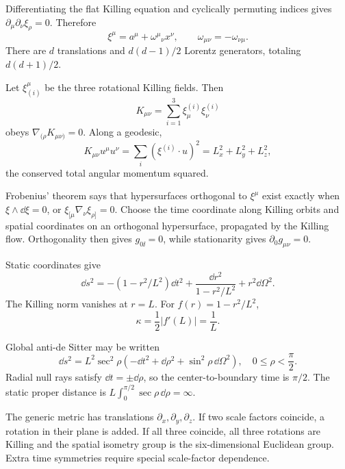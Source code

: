 \begin{solution}
Differentiating the flat Killing equation and cyclically permuting indices
gives \(\partial_\mu\partial_\nu\xi_\rho=0\).  Therefore
\[
\xi^\mu=a^\mu+\omega^\mu{}_\nu x^\nu,\qquad
\omega_{\mu\nu}=-\omega_{\nu\mu}.
\]
There are \(d\) translations and \(d(d-1)/2\) Lorentz generators, totaling
\(d(d+1)/2\).
\end{solution}

\begin{solution}
Let \(\xi_{(i)}^\mu\) be the three rotational Killing fields.  Then
\[
K_{\mu\nu}=\sum_{i=1}^3\xi^{(i)}_\mu\xi^{(i)}_\nu
\]
obeys \(\nabla_{(\rho}K_{\mu\nu)}=0\).  Along a geodesic,
\[
K_{\mu\nu}u^\mu u^\nu
=\sum_i(\xi^{(i)}\cdot u)^2=L_x^2+L_y^2+L_z^2,
\]
the conserved total angular momentum squared.
\end{solution}

\begin{solution}
Frobenius' theorem says that hypersurfaces orthogonal to \(\xi^\mu\) exist
exactly when
\(\xi\wedge\dd\xi=0\), or
\(\xi_{[\mu}\nabla_\nu\xi_{\rho]}=0\).  Choose the time coordinate along
Killing orbits and spatial coordinates on an orthogonal hypersurface,
propagated by the Killing flow.  Orthogonality then gives \(g_{0\ii}=0\), while
stationarity gives \(\partial_0g_{\mu\nu}=0\).
\end{solution}

\begin{solution}
Static coordinates give
\[
\dd s^2=-(1-r^2/L^2)\dd t^2
+\frac{\dd r^2}{1-r^2/L^2}+r^2\dd\Omega^2.
\]
The Killing norm vanishes at \(r=L\).  For
\(f(r)=1-r^2/L^2\),
\[
\kappa=\frac12|f'(L)|=\frac1L.
\]
\end{solution}

\begin{solution}
Global anti-de Sitter may be written
\[
\dd s^2=L^2\sec^2\rho
(-\dd t^2+\dd\rho^2+\sin^2\rho\,\dd\Omega^2),
\quad0\leq\rho<\frac\pi2.
\]
Radial null rays satisfy \(\dd t=\pm\dd\rho\), so the center-to-boundary time
is \(\pi/2\).  The static proper distance is
\(L\int_0^{\pi/2}\sec\rho\,\dd\rho=\infty\).
\end{solution}

\begin{solution}
The generic metric has translations
\(\partial_x,\partial_y,\partial_z\).  If two scale factors coincide, a
rotation in their plane is added.  If all three coincide, all three rotations
are Killing and the spatial isometry group is the six-dimensional Euclidean
group.  Extra time symmetries require special scale-factor dependence.
\end{solution}

